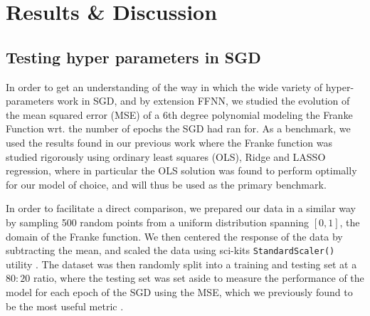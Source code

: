 \documentclass[reprint, english, nofootinbib]{revtex4-2}
\begin{document}

\section{Results \& Discussion}
\subsection{Testing hyper parameters in SGD}
\noindent
In order to get an understanding of the way in which the wide variety of hyper-parameters work in SGD, and by extension FFNN, we studied the evolution of the mean squared error (MSE) of a $6$th degree polynomial modeling the Franke Function wrt. the number of epochs the SGD had ran for. As a benchmark, we used the results found in our previous work \cite{4155_project_1} where the Franke function was studied rigorously using ordinary least squares (OLS), Ridge and LASSO regression, where in particular the OLS solution was found to perform optimally for our model of choice, and will thus be used as the primary benchmark.

In order to facilitate a direct comparison, we prepared our data in a similar way by sampling 500 random points from a uniform distribution spanning $[0, 1]$, the domain of the Franke function. We then centered the response of the data by subtracting the mean, and scaled the data using sci-kits \lstinline{StandardScaler()} utility \cite{scikit-learn}. The dataset was then randomly split into a training and testing set at a $80:20$ ratio, where the testing set was set aside to measure the performance of the model for each epoch of the SGD using the MSE, which we previously found to be the most useful metric \cite{4155_project_1}.
\end{document}
